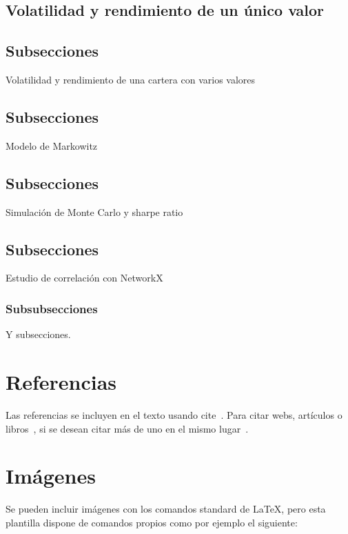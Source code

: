 \subsection{Volatilidad y rendimiento de un único valor}

\subsection{Subsecciones}

Volatilidad y rendimiento de una cartera con varios valores

\subsection{Subsecciones}

Modelo de Markowitz

\subsection{Subsecciones}

Simulación de Monte Carlo y sharpe ratio


\subsection{Subsecciones}

Estudio de correlación con NetworkX



\subsubsection{Subsubsecciones}

Y subsecciones. 


\section{Referencias}

Las referencias se incluyen en el texto usando cite~\cite{wiki:latex}. Para citar webs, artículos o libros~\cite{koza92}, si se desean citar más de uno en el mismo lugar~\cite{bortolot2005, koza92}.


\section{Imágenes}

Se pueden incluir imágenes con los comandos standard de \LaTeX, pero esta plantilla dispone de comandos propios como por ejemplo el siguiente:

